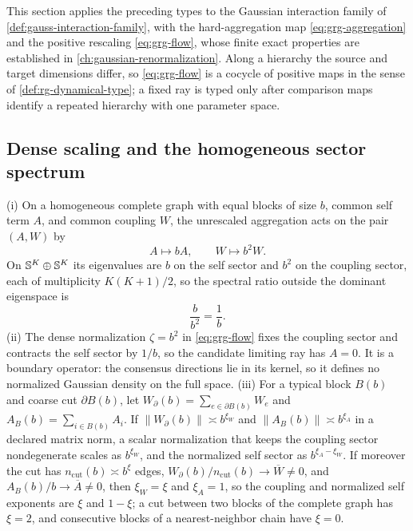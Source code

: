 This section applies the preceding types to the Gaussian interaction family
of \cref{def:gauss-interaction-family}, with the hard-aggregation map
\eqref{eq:grg-aggregation} and the positive rescaling \eqref{eq:grg-flow}, whose
finite exact properties are established in
\cref{ch:gaussian-renormalization}. Along a hierarchy the source and target
dimensions differ, so \eqref{eq:grg-flow} is a cocycle of positive maps in the
sense of \cref{def:rg-dynamical-type}; a fixed ray is typed only after
comparison maps identify a repeated hierarchy with one parameter space.

\subsection{Dense scaling and the homogeneous sector spectrum}
\label{sec:grg-numerical-gate}

(i) On a homogeneous complete graph with equal blocks of size \(b\), common
self term \(A\), and common coupling \(W\), the unrescaled aggregation acts on
the pair \((A,W)\) by
\begin{equation}
A\longmapsto bA,\qquad W\longmapsto b^2W.
\label{eq:grg-homogeneous-map}
\end{equation}
On \(\mathbb S^K\oplus\mathbb S^K\) its eigenvalues are \(b\) on the self sector and
\(b^2\) on the coupling sector, each of multiplicity \(K(K+1)/2\), so the
spectral ratio outside the dominant eigenspace is
\begin{equation}
\frac{b}{b^2}=\frac1b.
\label{eq:grg-sector-gap}
\end{equation}
(ii) The dense normalization \(\zeta=b^2\) in \eqref{eq:grg-flow} fixes the
coupling sector and contracts the self sector by \(1/b\), so the candidate
limiting ray has \(A=0\). It is a boundary operator: the consensus directions
lie in its kernel, so it defines no normalized Gaussian density on the full
space. (iii) For a typical block \(B(b)\) and coarse cut \(\partial B(b)\), let
\(W_\partial(b)=\sum_{e\in\partial B(b)}W_e\) and
\(A_B(b)=\sum_{i\in B(b)}A_i\). If
\(\lVert W_\partial(b)\rVert\asymp b^{\xi_W}\) and
\(\lVert A_B(b)\rVert\asymp b^{\xi_A}\) in a declared matrix norm, a scalar
normalization that keeps the coupling sector nondegenerate scales as
\(b^{\xi_W}\), and the normalized self sector as \(b^{\xi_A-\xi_W}\). If
moreover the cut has \(n_{\mathrm{cut}}(b)\asymp b^\xi\) edges,
\(W_\partial(b)/n_{\mathrm{cut}}(b)\to\overline W\neq0\), and
\(A_B(b)/b\to\overline A\neq0\), then \(\xi_W=\xi\) and \(\xi_A=1\), so the
coupling and normalized self exponents are \(\xi\) and \(1-\xi\); a cut between
two blocks of the complete graph has \(\xi=2\), and consecutive blocks of a
nearest-neighbor chain have \(\xi=0\). 

